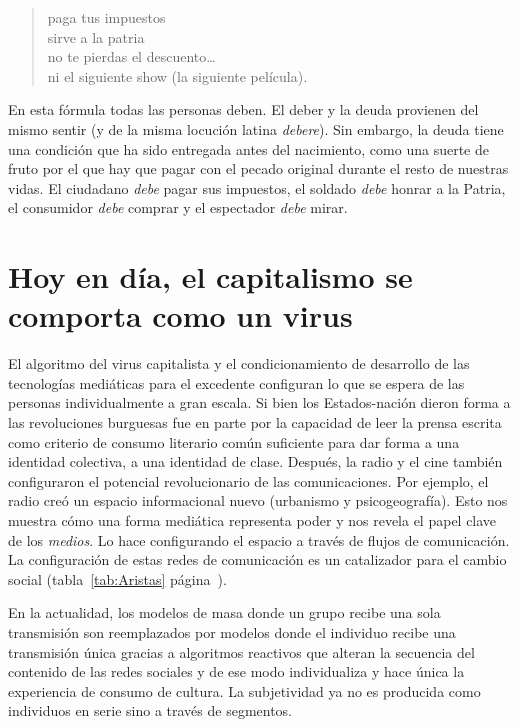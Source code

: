 \begin{quote}
	paga tus impuestos\\
	sirve a la patria\\
	no te pierdas el descuento\ldots{}\\
	ni el siguiente show (la siguiente película).
\end{quote}

En esta fórmula todas las personas deben. El deber y la deuda provienen del mismo sentir (y de la misma locución latina \emph{debere}). Sin embargo, la deuda tiene una condición que ha sido entregada antes del nacimiento, como una suerte de fruto por el que hay que pagar con el pecado original durante el resto de nuestras vidas. El ciudadano \emph{debe} pagar sus impuestos, el soldado \emph{debe} honrar a la Patria, el consumidor \emph{debe} comprar y el espectador \emph{debe} mirar.

\section{Hoy en día, el capitalismo se comporta como un virus}
\label{sec:viruscapitalista}

El algoritmo del virus capitalista y el condicionamiento de desarrollo de las tecnologías mediáticas para el excedente configuran lo que se espera de las personas individualmente a gran escala. Si bien los Estados-nación dieron forma a las revoluciones burguesas fue en parte por la capacidad de leer la prensa escrita como criterio de consumo literario común suficiente para dar forma a una identidad colectiva, a una identidad de clase. Después, la radio y el cine también configuraron el potencial revolucionario de las comunicaciones. Por ejemplo, el radio creó un espacio informacional nuevo (urbanismo y psicogeografía). Esto nos muestra cómo una forma mediática representa poder y nos revela el papel clave de los \emph{medios}. Lo hace configurando el espacio a través de flujos de comunicación. La configuración de estas redes de comunicación es un catalizador para el cambio social (tabla~\ref{tab:Aristas} página~\pageref{tab:Aristas}).

En la actualidad, los modelos de masa donde un grupo recibe una sola transmisión son reemplazados por modelos donde el individuo recibe una transmisión única gracias a algoritmos reactivos que alteran la secuencia del contenido de las redes sociales y de ese modo individualiza y hace única la experiencia de consumo de cultura. La subjetividad ya no es producida como individuos en serie sino a través de segmentos.

